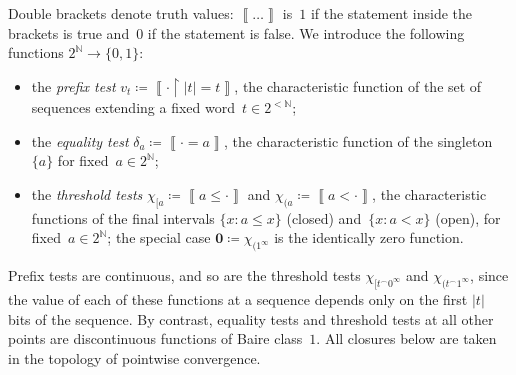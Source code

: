\documentclass[psamsfonts]{amsart}
\theoremstyle{definition}
\theoremstyle{remark}
\newcommand{\Brack}[1]{\left\llbracket{#1}\right\rrbracket}
\numberwithin{equation}{section}
\begin{document}
Double brackets denote truth values: $\Brack{\dots}$ is~$1$ if the statement inside the brackets is true and~$0$ if the statement is false.
We introduce the following functions $2^{\mathbb{N}}\to\{0,1\}$:
\begin{itemize}
\item
  the \emph{prefix test} $v_t\coloneqq \Brack{\cdot{\restriction}|t| = t}$, the characteristic function of the set of sequences extending a fixed word~$t\in2^{<\mathbb{N}}$;
\item
  the \emph{equality test} $\delta_a\coloneqq\Brack{\cdot = a}$, the characteristic function of the singleton $\{a\}$ for fixed~$a\in2^{\mathbb{N}}$;
\item
  the \emph{threshold tests} $\chi_{[a}\coloneqq\Brack{a\le \cdot}$ and $\chi_{(a}\coloneqq\Brack{a<\cdot}$, the characteristic functions of the final intervals $\{x:a\le x\}$ (closed) and~$\{x:a<x\}$ (open), for fixed~$a\in2^{\mathbb{N}}$;
  the special case $\mathbf{0}\coloneqq \chi_{(1^\infty}$ is the identically zero function.
\end{itemize}
Prefix tests are continuous, and so are the threshold tests $\chi_{[t^\frown0^\infty}$ and $\chi_{(t^\frown1^\infty}$, since the value of each of these functions at a sequence depends only on the first $|t|$ bits of the sequence.
By contrast, equality tests and threshold tests at all other points are discontinuous functions of Baire class~$1$.
All closures below are taken in the topology of pointwise convergence.
\end{document}
